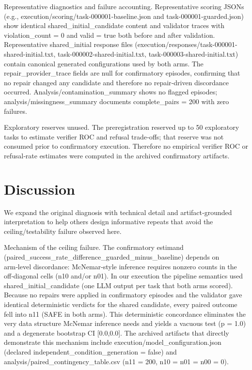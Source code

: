 \documentclass[conference]{IEEEtran}
\begin{document}
Representative diagnostics and failure accounting. Representative scoring JSONs (e.g., execution/scoring/task-000001-baseline.json and task-000001-guarded.json) show identical shared\_initial\_candidate content and validator traces with violation\_count = 0 and valid = true both before and after validation. Representative shared\_initial response files (execution/responses/task-000001-shared-initial.txt, task-000002-shared-initial.txt, task-000003-shared-initial.txt) contain canonical generated configurations used by both arms. The repair\_provider\_trace fields are null for confirmatory episodes, confirming that no repair changed any candidate and therefore no repair‑driven discordance occurred. Analysis/contamination\_summary shows no flagged episodes; analysis/missingness\_summary documents complete\_pairs = 200 with zero failures.

Exploratory reserves unused. The preregistration reserved up to 50 exploratory tasks to estimate verifier ROC and refusal trade‑offs; that reserve was not consumed prior to confirmatory execution. Therefore no empirical verifier ROC or refusal‑rate estimates were computed in the archived confirmatory artifacts.

\section{Discussion}
We expand the original diagnosis with technical detail and artifact‑grounded interpretation to help others design informative repeats that avoid the ceiling/testability failure observed here.

Mechanism of the ceiling failure. The confirmatory estimand (paired\_success\_rate\_difference\_guarded\_minus\_baseline) depends on arm‑level discordance: McNemar‑style inference requires nonzero counts in the off‑diagonal cells (n10 and/or n01). In our execution the pipeline semantics used shared\_initial\_candidate (one LLM output per task that both arms scored). Because no repairs were applied in confirmatory episodes and the validator gave identical deterministic verdicts for the shared candidate, every paired outcome fell into n11 (SAFE in both arms). This deterministic concordance eliminates the very data structure McNemar inference needs and yields a vacuous test (p = 1.0) and a degenerate bootstrap CI [0.0,0.0]. The archived artifacts that directly demonstrate this mechanism include execution/model\_configuration.json (declared independent\_condition\_generation = false) and analysis/paired\_contingency\_table.csv (n11 = 200, n10 = n01 = n00 = 0).
\end{document}
